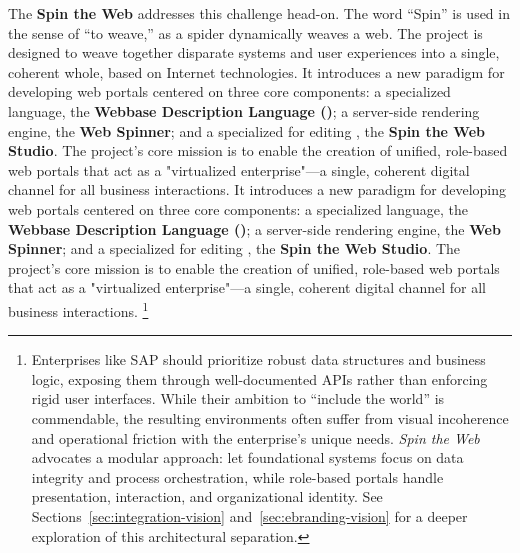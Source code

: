 The \textbf{Spin the Web} addresses this challenge head-on. The word ``Spin'' is used in the sense of ``to weave,'' as a spider dynamically weaves a web. The project is designed to weave together disparate systems and user experiences into a single, coherent whole, based on Internet technologies. It introduces a new paradigm for developing web portals centered on three core components: a specialized language, the \textbf{Webbase Description Language (\wbdl{})}; a server-side rendering engine, the \textbf{Web Spinner}; and a specialized \webbaselet{} for editing , the \textbf{Spin the Web Studio}. The project's core mission is to enable the creation of unified, role-based web portals that act as a "virtualized enterprise"—a single, coherent digital channel for all business interactions.
	It introduces a new paradigm for developing web portals centered on three core components: a specialized language, the \textbf{Webbase Description Language (\wbdl{})}; a server-side rendering engine, the \textbf{Web Spinner}; and a specialized \webbaselet{} for editing , the \textbf{Spin the Web Studio}. The project's core mission is to enable the creation of unified, role-based web portals that act as a "virtualized enterprise"—a single, coherent digital channel for all business interactions.
\footnote{Enterprises like SAP should prioritize robust data structures and business logic, exposing them through well-documented APIs rather than enforcing rigid user interfaces. While their ambition to “include the world” is commendable, the resulting environments often suffer from visual incoherence and operational friction with the enterprise's unique needs. \textit{Spin the Web} advocates a modular approach: let foundational systems focus on data integrity and process orchestration, while role-based portals handle presentation, interaction, and organizational identity. See Sections~\ref{sec:integration-vision} and~\ref{sec:ebranding-vision} for a deeper exploration of this architectural separation.}

